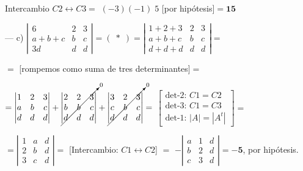 \begin{proofw}
\noindent \small{Intercambio $C2 \leftrightarrow C3$}\normalsize{$=$} 
$(-3)(-1)\; 5 $ \small{[por hipótesis]}\normalsize{$=$}$\boldsymbol{15}$ 

\noindent --- c) $\left| \begin{matrix} 6&2&3\\a+b+c&b&c\\3d&d&d  \end{matrix} \right|= (\;*\;)=
 \left| \begin{matrix} 1+2+3&2&3\\a+b+c&b&c\\d+d+d&d&d  \end{matrix} \right|=$

\noindent \normalsize{$=$} \small{[rompemos como suma de tres determinantes]}\normalsize{$=$}

\noindent $=
 \left| \begin{matrix} 1&2&3\\a&b&c\\d&d&d  \end{matrix} \right|+
  \cancelto{0}{\left| \begin{matrix} 2&2&3\\b&b&c\\d&d&d  \end{matrix} \right|}+
   \cancelto{0}{\left| \begin{matrix} 3&2&3\\c&b&c\\d&d&d  \end{matrix} \right|}=$ \small{$\left[ \begin{matrix} 
\text{det-2: } C1=C2 \\
\text{det-3: } C1=C3 \\
\text{det-1: } |A|=|A^t| 
\end{matrix} \right]$}\normalsize{$=$}

\noindent $=\left| \begin{matrix} 1&a&d\\2&b&d\\3&c&d  \end{matrix} \right| =$
\small{[Intercambio: $C1 \leftrightarrow C2$]} \normalsize{$=$}
$-\left| \begin{matrix} a&1&d\\b&2&d\\c&3&d  \end{matrix} \right| = \boldsymbol{-5}$, \small{por hipótesis}\normalsize{.}

\end{proofw}

